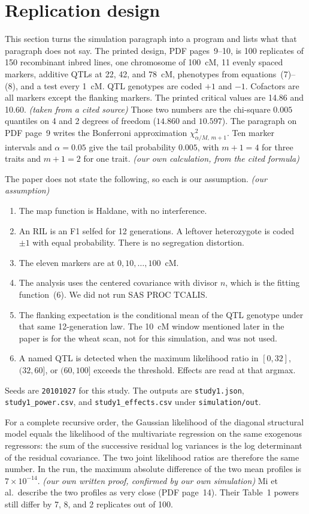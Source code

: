 \documentclass[11pt]{article}
\newcommand{\ev}[1]{\textup{\emph{(#1)}}}
\begin{document}
\section{Replication design}

This section turns the simulation paragraph into a program and lists what
that paragraph does not say. The printed design, PDF pages~9--10, is 100 replicates of 150 recombinant inbred lines, one
chromosome of 100~cM, 11 evenly spaced markers, additive QTLs at 22, 42, and
78~cM, phenotypes from equations~(7)--(8), and a test every 1~cM. QTL
genotypes are coded $+1$ and $-1$. Cofactors are all markers except the
flanking markers. The printed critical values are 14.86 and 10.60.
\ev{taken from a cited source}
Those two numbers are the chi-square $0.005$ quantiles on 4 and 2 degrees of
freedom ($14.860$ and $10.597$). The paragraph on PDF page~9 writes the
Bonferroni approximation $\chi^2_{\alpha/M,\,m+1}$. Ten marker intervals and
$\alpha=0.05$ give the tail probability $0.005$, with $m+1=4$ for three
traits and $m+1=2$ for one trait. \ev{our own calculation, from the cited formula}

The paper does not state the following, so each is our assumption.
\ev{our assumption}
\begin{enumerate}
\item The map function is Haldane, with no interference.
\item An RIL is an F1 selfed for 12 generations. A leftover heterozygote is
coded $\pm 1$ with equal probability. There is no segregation distortion.
\item The eleven markers are at $0,10,\ldots,100$~cM.
\item The analysis uses the centered covariance with divisor $n$, which is
the fitting function~(6). We did not run SAS PROC TCALIS.
\item The flanking expectation is the conditional mean of the QTL genotype
under that same 12-generation law. The 10~cM window mentioned later in the
paper is for the wheat scan, not for this simulation, and was not used.
\item A named QTL is detected when the maximum likelihood ratio in
$[0,32]$, $(32,60]$, or $(60,100]$ exceeds the threshold. Effects are read
at that argmax.
\end{enumerate}
Seeds are \texttt{20101027} for this study. The outputs are
\texttt{study1.json}, \texttt{study1\_power.csv}, and
\texttt{study1\_effects.csv} under \texttt{simulation/out}.

For a complete recursive order, the Gaussian likelihood of the diagonal
structural model equals the likelihood of the multivariate regression on the
same exogenous regressors: the sum of the successive residual log variances
is the log determinant of the residual covariance. The two joint likelihood
ratios are therefore the same number. In the run, the maximum absolute
difference of the two mean profiles is $7\times 10^{-14}$.
\ev{our own written proof, confirmed by our own simulation}
Mi et al.\ describe the two profiles as very close (PDF page~14). Their
Table~1 powers still differ by 7, 8, and 2 replicates out of 100.
\end{document}
